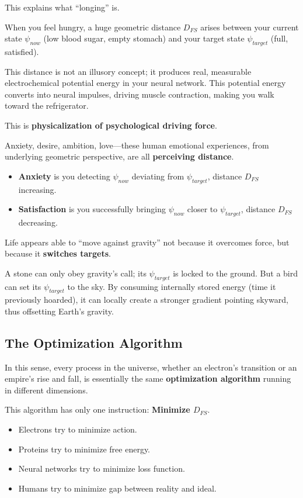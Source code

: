 This explains what ``longing'' is.

When you feel hungry, a huge geometric distance $D_{FS}$ arises between your current state $\psi_{now}$ (low blood sugar, empty stomach) and your target state $\psi_{target}$ (full, satisfied).

This distance is not an illusory concept; it produces real, measurable electrochemical potential energy in your neural network. This potential energy converts into neural impulses, driving muscle contraction, making you walk toward the refrigerator.

This is \textbf{physicalization of psychological driving force}.

Anxiety, desire, ambition, love---these human emotional experiences, from underlying geometric perspective, are all \textbf{perceiving distance}.

\begin{itemize}
\item \textbf{Anxiety} is you detecting $\psi_{now}$ deviating from $\psi_{target}$, distance $D_{FS}$ increasing.

\item \textbf{Satisfaction} is you successfully bringing $\psi_{now}$ closer to $\psi_{target}$, distance $D_{FS}$ decreasing.
\end{itemize}

Life appears able to ``move against gravity'' not because it overcomes force, but because it \textbf{switches targets}.

A stone can only obey gravity's call; its $\psi_{target}$ is locked to the ground. But a bird can set its $\psi_{target}$ to the sky. By consuming internally stored energy (time it previously hoarded), it can locally create a stronger gradient pointing skyward, thus offsetting Earth's gravity.

\subsection{The Optimization Algorithm}

In this sense, every process in the universe, whether an electron's transition or an empire's rise and fall, is essentially the same \textbf{optimization algorithm} running in different dimensions.

This algorithm has only one instruction: \textbf{Minimize $D_{FS}$}.

\begin{itemize}
\item Electrons try to minimize action.

\item Proteins try to minimize free energy.

\item Neural networks try to minimize loss function.

\item Humans try to minimize gap between reality and ideal.
\end{itemize}

